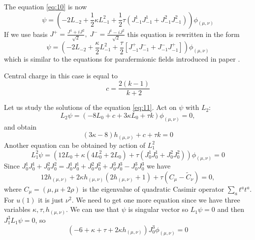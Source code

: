  The equation \eqref{eq:10} is now
\begin{equation}
  \label{eq:11}
  \psi=\left(-2L_{-2}+\frac{1}{2}\kappa L_{-1}^{2}+\frac{1}{2}\tau \left(J^{1}_{-1}J^{1}_{-1}+J^{2}_{-1}J^{2}_{-1}\right)\right) \phi_{(\mu,\nu)}
\end{equation}
If we use basis $J^{+}=\frac{J^{1}+iJ^{2}}{\sqrt{2}},\; J^{-}=\frac{J^{1}-iJ^{2}}{\sqrt{2}}$ this equation is rewritten in the form
\begin{equation}
 \psi= \left(-2 L_{-2}+\frac{\kappa}{2}L_{-1}^{2}+\frac{\tau}{2}\left[J^{+}_{-1}J^{-}_{-1}+J^{-}_{-1}J^{+}_{-1}\right]\right) \phi_{(\mu,\nu)}
\label{eq:12}
\end{equation}
which is similar to the equations for parafermionic fields introduced in paper \cite{santachiara2008sle}.

Central charge in this case is equal to
\begin{equation}
  \label{eq:14}
  c=\frac{2(k-1)}{k+2}
\end{equation}

Let us study the solutions of the equation \eqref{eq:11}. Act on $\psi$ with $L_{2}$:
\begin{equation}
  \label{eq:13}
  L_{2}\psi=(-8L_{0}+c+3\kappa L_{0}+\tau k)\phi_{(\mu,\nu)}=0,
\end{equation}
and obtain
\begin{equation}
  \label{eq:28}
  (3\kappa-8) h_{(\mu,\nu)}+c+\tau k =0
\end{equation}
Another equation can be obtained by action of $L_{1}^{2}$
\begin{equation}
  \label{eq:15}
  L_{1}^{2}\psi = (12 L_{0} + \kappa(4 L_{0}^{2}+2 L_{0}) +\tau (J_{0}^{1}J_{0}^{1}+J_{0}^{2}J_{0}^{2}))\phi_{(\mu,\nu)}=0
\end{equation}
Since $J_{0}^{1}J_{0}^{1}+J_{0}^{2}J_{0}^{2}=J_{0}^{1}J_{0}^{1}+J_{0}^{2}J_{0}^{2}+J_{0}^{3}J_{0}^{3}-J_{0}^{3}J_{0}^{3}$ we have
\begin{equation}
  \label{eq:17}
  12 h_{(\mu,\nu)}+2\kappa h_{(\mu,\nu)} (2h_{(\mu,\nu)}+1) +  \tau (C_{\mu}-\tilde{C}_{\nu})=0,
\end{equation}
where $C_{\mu}=(\mu,\mu+2\rho)$ is the eigenvalue of quadratic Casimir operator $\sum_{a}t^{a}t^{a}$. For $u(1)$ it is just $\nu^{2}$.
We need to get one more equation since we have three variables $\kappa,\tau,h_{(\mu,\nu)}$. We can use that $\psi$ is singular vector so $L_{1}\psi=0$ and then $J_{1}^{3}L_{1}\psi=0$, so
\begin{equation}
  \label{eq:29}
  \left(-6  + \kappa +  \tau +  2 \kappa h_{(\mu,\nu)}\right) J^{3}_{0} \phi_{(\mu,\nu)}=0
\end{equation}


